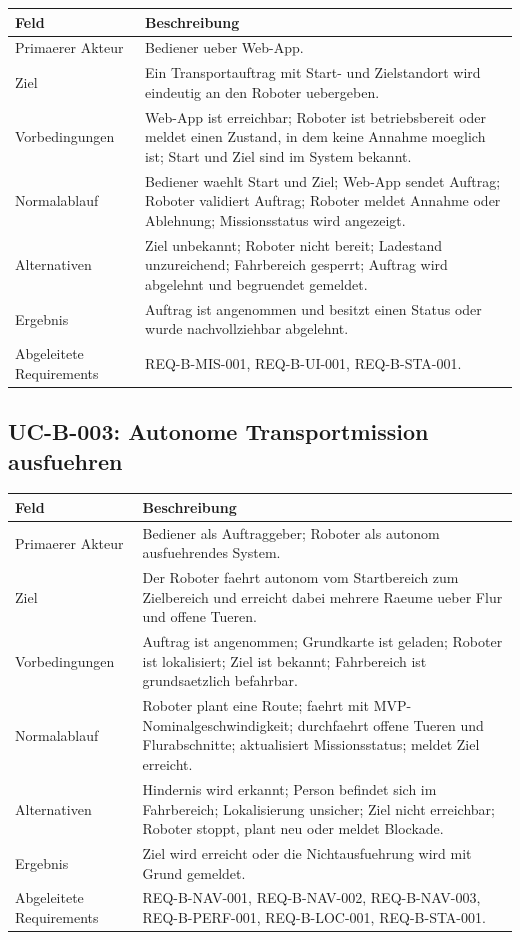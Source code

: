 \begin{longtable}{L{0.24\textwidth} L{0.64\textwidth}}
\toprule
Feld & Beschreibung \\
\midrule
Primaerer Akteur & Bediener ueber Web-App. \\
Ziel & Ein Transportauftrag mit Start- und Zielstandort wird eindeutig an den Roboter uebergeben. \\
Vorbedingungen & Web-App ist erreichbar; Roboter ist betriebsbereit oder meldet einen Zustand, in dem keine Annahme moeglich ist; Start und Ziel sind im System bekannt. \\
Normalablauf & Bediener waehlt Start und Ziel; Web-App sendet Auftrag; Roboter validiert Auftrag; Roboter meldet Annahme oder Ablehnung; Missionsstatus wird angezeigt. \\
Alternativen & Ziel unbekannt; Roboter nicht bereit; Ladestand unzureichend; Fahrbereich gesperrt; Auftrag wird abgelehnt und begruendet gemeldet. \\
Ergebnis & Auftrag ist angenommen und besitzt einen Status oder wurde nachvollziehbar abgelehnt. \\
Abgeleitete Requirements & REQ-B-MIS-001, REQ-B-UI-001, REQ-B-STA-001. \\
\bottomrule
\end{longtable}

\subsection{UC-B-003: Autonome Transportmission ausfuehren}

\begin{longtable}{L{0.24\textwidth} L{0.64\textwidth}}
\toprule
Feld & Beschreibung \\
\midrule
Primaerer Akteur & Bediener als Auftraggeber; Roboter als autonom ausfuehrendes System. \\
Ziel & Der Roboter faehrt autonom vom Startbereich zum Zielbereich und erreicht dabei mehrere Raeume ueber Flur und offene Tueren. \\
Vorbedingungen & Auftrag ist angenommen; Grundkarte ist geladen; Roboter ist lokalisiert; Ziel ist bekannt; Fahrbereich ist grundsaetzlich befahrbar. \\
Normalablauf & Roboter plant eine Route; faehrt mit MVP-Nominalgeschwindigkeit; durchfaehrt offene Tueren und Flurabschnitte; aktualisiert Missionsstatus; meldet Ziel erreicht. \\
Alternativen & Hindernis wird erkannt; Person befindet sich im Fahrbereich; Lokalisierung unsicher; Ziel nicht erreichbar; Roboter stoppt, plant neu oder meldet Blockade. \\
Ergebnis & Ziel wird erreicht oder die Nichtausfuehrung wird mit Grund gemeldet. \\
Abgeleitete Requirements & REQ-B-NAV-001, REQ-B-NAV-002, REQ-B-NAV-003, REQ-B-PERF-001, REQ-B-LOC-001, REQ-B-STA-001. \\
\bottomrule
\end{longtable}

